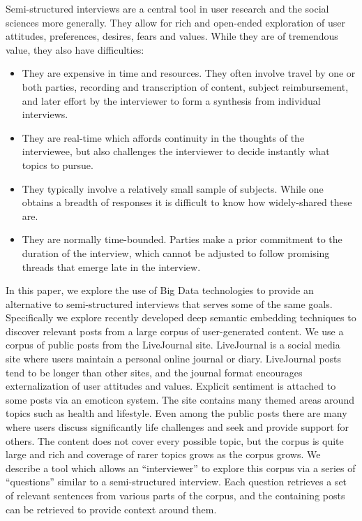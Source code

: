 \documentclass{sigchi}
\begin{document}
Semi-structured interviews are a central tool in user research and the social sciences more generally.
They allow for rich and open-ended exploration of user attitudes, preferences, desires, fears and values. 
While they are of tremendous value, they also have difficulties:

\begin{itemize}
\item They are expensive in time and resources. They often involve travel by one or both parties,
  recording and transcription of content, subject reimbursement, and later effort by the interviewer
  to form a synthesis from individual interviews.
\item They are real-time which affords continuity in the thoughts of the interviewee, but also challenges
  the interviewer to decide instantly what topics to pursue.
\item They typically involve a relatively small sample of subjects. While one obtains a breadth of
  responses it is difficult to know how widely-shared these are.
\item They are normally time-bounded. Parties make a prior commitment to the duration of the interview,
  which cannot be adjusted to follow promising threads that emerge late in the interview.
\end{itemize}

In this paper, we explore the use of Big Data technologies to provide an alternative to
semi-structured interviews that serves some of the same goals. Specifically we explore recently
developed deep semantic embedding techniques to discover relevant posts from a large corpus of
user-generated content. We use a corpus of public posts from the LiveJournal site.  LiveJournal is a
social media site where users maintain a personal online journal or diary. LiveJournal posts tend to
be longer than other sites, and the journal format encourages externalization of user attitudes and
values. Explicit sentiment is attached to some posts via an emoticon system. The site contains many
themed areas around topics such as health and lifestyle.  Even among the public posts there are many
where users discuss significantly life challenges and seek and provide support for others. The
content does not cover every possible topic, but the corpus is quite large and rich and coverage of
rarer topics grows as the corpus grows.  We describe a tool which allows an ``interviewer'' to
explore this corpus via a series of ``questions'' similar to a semi-structured interview. Each
question retrieves a set of relevant sentences from various parts of the corpus, and the containing
posts can be retrieved to provide context around them.
\end{document}
